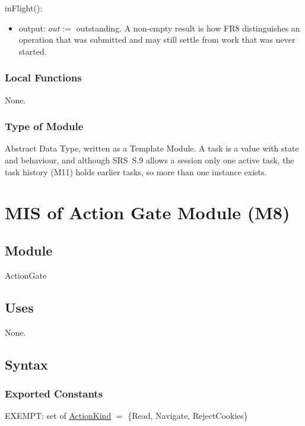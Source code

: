 \documentclass[12pt, titlepage]{article}
\begin{document}
\noindent inFlight():
\begin{itemize}
\item output: $out :=$ outstanding. A non-empty result is how FR8 distinguishes
an operation that was submitted and may still settle from work that was never
started.
\end{itemize}

\subsubsection{Local Functions}

None.

\subsubsection{Type of Module}

Abstract Data Type, written as a Template Module. A task is a value with state
and behaviour, and although SRS~S.9 allows a session only one active task, the
task history (M11) holds earlier tasks, so more than one instance exists.

\newpage

\section{MIS of Action Gate Module (M8)} \label{mod:gate}

\subsection{Module}

ActionGate

\subsection{Uses}

None.

\subsection{Syntax}

\subsubsection{Exported Constants}

EXEMPT: set of \hyperref[type:ActionKind]{ActionKind} $=$ \{Read, Navigate,
RejectCookies\}
\end{document}
